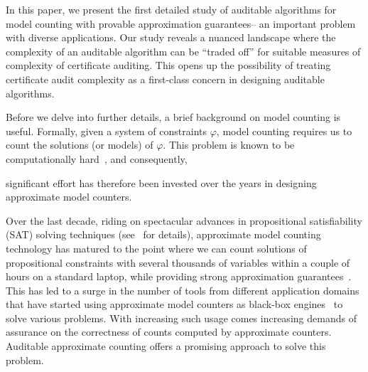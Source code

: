 In this paper, we present the first detailed study of auditable
algorithms for model counting with provable approximation guarantees--
an important problem with diverse applications.  Our study reveals a
nuanced landscape where the complexity of an auditable algorithm can
be ``traded off'' for suitable measures of complexity of certificate
auditing.  This opens up the possibility of treating certificate audit
complexity as a first-class concern in designing auditable
algorithms.

Before we delve into further details, a brief background on model
counting is useful.  Formally, given a system of constraints
$\varphi$, model counting requires us to count the solutions (or
models) of $\varphi$.  This problem is known to be computationally
hard~\cite{Valiant79}, and consequently, 

significant effort has therefore been invested over the
years in designing approximate model counters.

Over the last
decade, riding on spectacular advances in propositional satisfiability
(SAT) solving techniques (see~\cite{sat-technique} for details),
approximate model counting technology has matured to the point where
we can count solutions of propositional constraints with several
thousands of variables within a couple of hours on a standard laptop,
while providing strong approximation guarantees~\cite{approxmc}.  This
has led to a surge in the number of tools from different application
domains that have started using approximate model counters as
black-box
engines~\cite{klebanov2014,teuber2021quantifying,beck2020automating,zinkus2023mcfil}
to solve various problems.  With increasing such usage comes
increasing demands of assurance on the correctness of counts computed
by approximate counters.  Auditable approximate counting offers a
promising approach to solve this problem.

